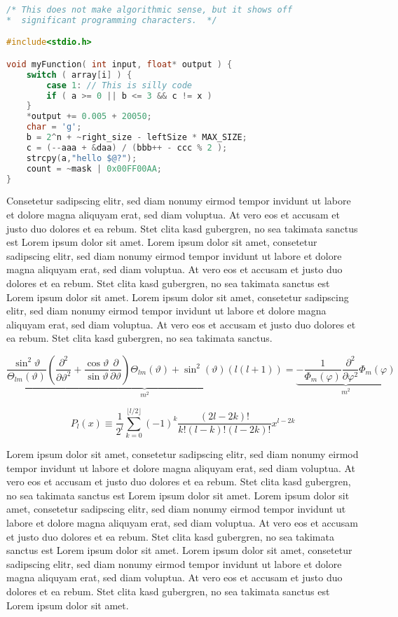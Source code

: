 \documentclass[ %
	DIV=15, %
	BCOR=14mm, %
	parskip=half, %
	headsepline, %
	cleardoublepage=empty, %
	tablecaptionabove, %
	toc=bib, %
	toc=listofnumbered, %
	listof=leveldown, %
	numbers=noendperiod %
	]{scrbook}
\begin{document}
\begin{lstlisting}[language=C, caption=Ein Quellcode-Beispiel]
/* This does not make algorithmic sense, but it shows off
*  significant programming characters.  */

#include<stdio.h>

void myFunction( int input, float* output ) {
	switch ( array[i] ) {
		case 1: // This is silly code
		if ( a >= 0 || b <= 3 && c != x )
	}
	*output += 0.005 + 20050;
	char = 'g';
	b = 2^n + ~right_size - leftSize * MAX_SIZE;
	c = (--aaa + &daa) / (bbb++ - ccc % 2 );
	strcpy(a,"hello $@?");
	count = ~mask | 0x00FF00AA;
}
\end{lstlisting}

Consetetur sadipscing elitr, sed diam nonumy eirmod tempor invidunt ut labore et dolore magna aliquyam erat, sed diam voluptua. At vero eos et accusam et justo duo dolores et ea rebum. Stet clita kasd gubergren, no sea takimata sanctus est Lorem ipsum dolor sit amet. Lorem ipsum dolor sit amet, consetetur sadipscing elitr, sed diam nonumy eirmod tempor invidunt ut labore et dolore magna aliquyam erat, sed diam voluptua. At vero eos et accusam et justo duo dolores et ea rebum. Stet clita kasd gubergren, no sea takimata sanctus est Lorem ipsum dolor sit amet. Lorem ipsum dolor sit amet, consetetur sadipscing elitr, sed diam nonumy eirmod tempor invidunt ut labore et dolore magna aliquyam erat, sed diam voluptua. At vero eos et accusam et justo duo dolores et ea rebum. Stet clita kasd gubergren, no sea takimata sanctus.

\begin{equation}
	\underbrace{\frac{\sin^{2}\vartheta}{\Theta_{lm}(\vartheta)}\left(\frac{\partial^{2}}{\partial\vartheta^{2}}+\frac{\cos\vartheta}{\sin\vartheta}\frac{\partial}{\partial\vartheta}\right)\Theta_{lm}(\vartheta)+\sin^{2}(\vartheta)(l(l+1))}_{m^{2}}=\underbrace{-\frac{1}{\Phi_{m}(\varphi)}\frac{\partial^{2}}{\partial\varphi^{2}}\Phi_{m}(\varphi)}_{m^{2}}
\end{equation}

\begin{equation}
	P_l (x)\equiv\frac {1}{2^l}\sum_{k=0}^{\lfloor l/2\rfloor} (-1)^k \frac{(2l-2k)!}{k!(l-k)!(l-2k)!} x^{l-2k}
\end{equation}

Lorem ipsum dolor sit amet, consetetur sadipscing elitr, sed diam nonumy eirmod tempor invidunt ut labore et dolore magna aliquyam erat, sed diam voluptua. At vero eos et accusam et justo duo dolores et ea rebum. Stet clita kasd gubergren, no sea takimata sanctus est Lorem ipsum dolor sit amet. Lorem ipsum dolor sit amet, consetetur sadipscing elitr, sed diam nonumy eirmod tempor invidunt ut labore et dolore magna aliquyam erat, sed diam voluptua. At vero eos et accusam et justo duo dolores et ea rebum. Stet clita kasd gubergren, no sea takimata sanctus est Lorem ipsum dolor sit amet. Lorem ipsum dolor sit amet, consetetur sadipscing elitr, sed diam nonumy eirmod tempor invidunt ut labore et dolore magna aliquyam erat, sed diam voluptua. At vero eos et accusam et justo duo dolores et ea rebum. Stet clita kasd gubergren, no sea takimata sanctus est Lorem ipsum dolor sit amet.
\end{document}
